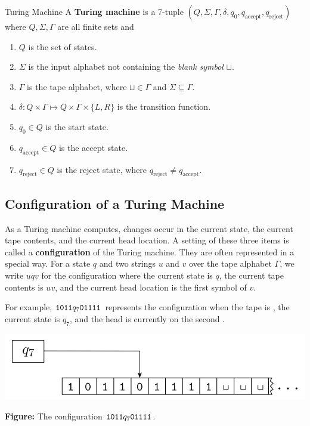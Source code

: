 \documentclass[letterpaper]{article}
\begin{document}
\begin{definition}{Turing Machine}{}
    A \textbf{Turing machine} is a 7-tuple $(Q, \Sigma, \Gamma, \delta, q_0, q_{\text{accept}}, q_{\text{reject}})$ where $Q, \Sigma, \Gamma$ are all finite sets and 
    \begin{enumerate}
        \item $Q$ is the set of states.
        \item $\Sigma$ is the input alphabet not containing the \emph{blank symbol} $\sqcup$.
        \item $\Gamma$ is the tape alphabet, where $\sqcup \in \Gamma$ and $\Sigma \subseteq \Gamma$. 
        \item $\delta: Q \times \Gamma \mapsto Q \times \Gamma \times \{L, R\}$ is the transition function. 
        \item $q_0 \in Q$ is the start state. 
        \item $q_{\text{accept}} \in Q$ is the accept state.
        \item $q_{\text{reject}} \in Q$ is the reject state, where $q_{\text{reject}} \neq q_{\text{accept}}$.   
    \end{enumerate} 
\end{definition}

\subsection{Configuration of a Turing Machine}
As a Turing machine computes, changes occur in the current state, the current tape contents, and the current head location. A setting of these three items is called a \textbf{configuration} of the Turing machine. They are often represented in a special way. For a state $q$ and two strings $u$ and $v$ over the tape alphabet $\Gamma$, we write $uqv$ for the configuration where the current state is $q$, the current tape contents is $uv$, and the current head location is the first symbol of $v$. 

\bigskip 

For example, $\texttt{1011}q_7\texttt{01111}$ represents the configuration when the tape is , the current state is $q_7$, and the head is currently on the second .
\begin{center}
    \includegraphics[scale=0.5]{assets/turing_config_1.png}

    \textbf{Figure:} The configuration $\texttt{1011}q_7\texttt{01111}$. 
\end{center}
\end{document}
